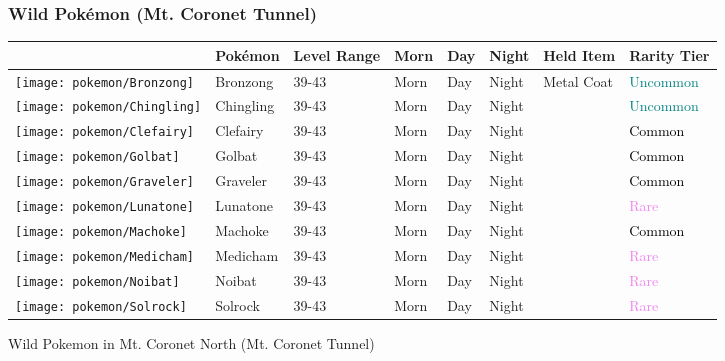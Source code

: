 \subsubsection{Wild Pokémon (Mt. Coronet Tunnel)}%
\label{ssubsec:WildPokmon(Mt.CoronetTunnel)}%
\begin{longtable}{||l l l l l l l l||}%
\hline%
&Pokémon&Level Range&Morn&Day&Night&Held Item&Rarity Tier\\%
\hline%
\endhead%
\hline%
\texttt{[image: pokemon/Bronzong]}&Bronzong&39{-}43&Morn&Day&Night&Metal Coat&\textcolor{teal}{%
Uncommon%
}\\%
\hline%
\texttt{[image: pokemon/Chingling]}&Chingling&39{-}43&Morn&Day&Night&&\textcolor{teal}{%
Uncommon%
}\\%
\hline%
\texttt{[image: pokemon/Clefairy]}&Clefairy&39{-}43&Morn&Day&Night&&\textcolor{black}{%
Common%
}\\%
\hline%
\texttt{[image: pokemon/Golbat]}&Golbat&39{-}43&Morn&Day&Night&&\textcolor{black}{%
Common%
}\\%
\hline%
\texttt{[image: pokemon/Graveler]}&Graveler&39{-}43&Morn&Day&Night&&\textcolor{black}{%
Common%
}\\%
\hline%
\texttt{[image: pokemon/Lunatone]}&Lunatone&39{-}43&Morn&Day&Night&&\textcolor{violet}{%
Rare%
}\\%
\hline%
\texttt{[image: pokemon/Machoke]}&Machoke&39{-}43&Morn&Day&Night&&\textcolor{black}{%
Common%
}\\%
\hline%
\texttt{[image: pokemon/Medicham]}&Medicham&39{-}43&Morn&Day&Night&&\textcolor{violet}{%
Rare%
}\\%
\hline%
\texttt{[image: pokemon/Noibat]}&Noibat&39{-}43&Morn&Day&Night&&\textcolor{violet}{%
Rare%
}\\%
\hline%
\texttt{[image: pokemon/Solrock]}&Solrock&39{-}43&Morn&Day&Night&&\textcolor{violet}{%
Rare%
}\\%
\hline%
\end{longtable}%
\caption{Wild Pokemon in Mt. Coronet North (Mt. Coronet Tunnel)}